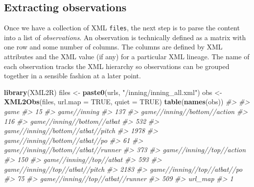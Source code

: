 \documentclass[12pt,]{isuthesis}
\newenvironment{Shaded}{\begin{snugshade}}{\end{snugshade}}
\newcommand{\KeywordTok}[1]{\textcolor[rgb]{0.13,0.29,0.53}{\textbf{{#1}}}}
\newcommand{\DataTypeTok}[1]{\textcolor[rgb]{0.13,0.29,0.53}{{#1}}}
\newcommand{\StringTok}[1]{\textcolor[rgb]{0.31,0.60,0.02}{{#1}}}
\newcommand{\CommentTok}[1]{\textcolor[rgb]{0.56,0.35,0.01}{\textit{{#1}}}}
\newcommand{\OtherTok}[1]{\textcolor[rgb]{0.56,0.35,0.01}{{#1}}}
\newcommand{\NormalTok}[1]{{#1}}
\begin{document}
\subsection{Extracting observations}\label{extracting-observations}

Once we have a collection of XML \texttt{files}, the next step is to
parse the content into a list of \textit{observations}. An observation
is technically defined as a matrix with one row and some number of
columns. The columns are defined by XML attributes and the XML value (if
any) for a particular XML lineage. The name of each observation tracks
the XML hierarchy so observations can be grouped together in a sensible
fashion at a later point.

\begin{Shaded}
\begin{Highlighting}[]
\KeywordTok{library}\NormalTok{(XML2R)}
\NormalTok{files <-}\StringTok{ }\KeywordTok{paste0}\NormalTok{(urls, }\StringTok{"/inning/inning_all.xml"}\NormalTok{)}
\NormalTok{obs <-}\StringTok{ }\KeywordTok{XML2Obs}\NormalTok{(files, }\DataTypeTok{url.map =} \OtherTok{TRUE}\NormalTok{, }\DataTypeTok{quiet =} \OtherTok{TRUE}\NormalTok{) }
\KeywordTok{table}\NormalTok{(}\KeywordTok{names}\NormalTok{(obs))}
\CommentTok{#> }
\CommentTok{#>                                game }
\CommentTok{#>                                  15 }
\CommentTok{#>                        game//inning }
\CommentTok{#>                                 137 }
\CommentTok{#>        game//inning//bottom//action }
\CommentTok{#>                                 116 }
\CommentTok{#>         game//inning//bottom//atbat }
\CommentTok{#>                                 532 }
\CommentTok{#>  game//inning//bottom//atbat//pitch }
\CommentTok{#>                                1978 }
\CommentTok{#>     game//inning//bottom//atbat//po }
\CommentTok{#>                                  61 }
\CommentTok{#> game//inning//bottom//atbat//runner }
\CommentTok{#>                                 373 }
\CommentTok{#>           game//inning//top//action }
\CommentTok{#>                                 150 }
\CommentTok{#>            game//inning//top//atbat }
\CommentTok{#>                                 593 }
\CommentTok{#>     game//inning//top//atbat//pitch }
\CommentTok{#>                                2183 }
\CommentTok{#>        game//inning//top//atbat//po }
\CommentTok{#>                                  75 }
\CommentTok{#>    game//inning//top//atbat//runner }
\CommentTok{#>                                 509 }
\CommentTok{#>                             url_map }
\CommentTok{#>                                   1}
\end{Highlighting}
\end{Shaded}
\end{document}
